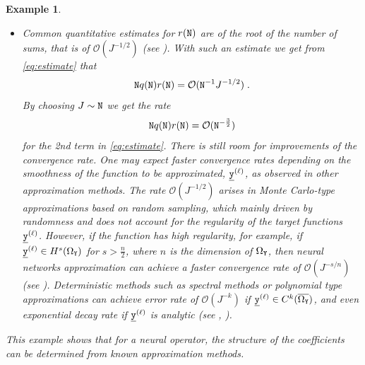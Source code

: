 \documentclass[10pt]{article}
\numberwithin{equation}{section}
\newtheorem{example}[example]{Example}
\theoremstyle{nonumberplain}
\newcommand{\Y}{{\tt Y}}
\newcommand{\y}{{\tt y}}
\newcommand{\x}{{\tt x}}
\newcommand{\ulx}{\underline{\x}}
\newcommand{\uly}{\underline{\y}}
\newcommand{\no}{{\tt N}}
\begin{document}
\begin{example}
\begin{itemize}
\begin{equation}
        	\x(t_k) \ulx^{(\ell)}(t_k) = w_{k}^{(\ell)} \x(t_k) \;,
        \end{equation} 
        which carries over the sampling of the training functions to the weights.
        Moreover, comparing with \autoref{eq:nldeep}, the coefficients $C_k^{(\ell)}$ are determined by
        \begin{equation*}
        	C_k^{(\ell)} = \begin{cases} \frac{1}{2K} &\text{ for } k = 0 \text{ and } K\\
        		\frac{1}{K} &\text{ otherwise. }
        	\end{cases}
        \end{equation*}
       These coefficients are therefore given by the trapezoidal rule.
      If we choose the number of discretization points in the trapezoidal rule to match the number of training data points (i.e., if $K=\no$), then we obtain the rate for $q_\no$ defined in \autoref{eq:qn}
        \begin{equation*}
        	q(\no) = \mathcal{O}(\no^{-2})\;.
        \end{equation*} 
        \item Common quantitative estimates for $r(\no)$ are of the root of the number of sums, that is of $\mathcal{O}(J^{-1/2})$ (see \cite{Bar93}). With such an estimate we get from \autoref{eq:estimate} that
        \begin{equation} \label{eq:estNqr}
        	\no q(\no) r(\no) = \mathcal{O}(\no^{-1} J^{-1/2})\;.
        \end{equation}
        By choosing $J \sim \no$ we get the rate 
        \begin{equation*}
        	\no q(\no) r(\no) = \mathcal{O}(\no^{-\frac{3}{2}})
        \end{equation*}
        for the 2nd term in \autoref{eq:estimate}. There is still room for improvements of the convergence rate. One may expect faster convergence rates depending on the smoothness of the function to be approximated, $\uly^{(\ell)}$, as observed in other approximation methods. The rate $\mathcal{O}(J^{-1/2})$ arises in Monte Carlo-type approximations based on random sampling, which mainly driven by randomness and does not account for the regularity of the target functions $\uly^{(\ell)}$. However, if the function has high regularity, for example, if $\uly^{(\ell)} \in H^s(\Omega_\Y)$ for $s > \frac{n}{2}$, where $n$ is the dimension of $\Omega_\Y$, then neural networks approximation can achieve a faster convergence rate of $\mathcal{O}(J^{-s/n})$  (see \cite{DevHanPet21}). Deterministic methods such as spectral methods or polynomial type approximations can achieve error rate of $\mathcal{O}(J^{-k})$ if $\uly^{(\ell)} \in C^k(\overline{ \Omega_\Y})$, and even exponential decay rate if $\uly^{(\ell)}$ is analytic (see \cite{Kat76}, \cite{Dun30}).
	\end{itemize}
	
	This example shows that for a neural operator, the structure of the coefficients can be determined from known approximation methods.
\end{example}
\end{document}
